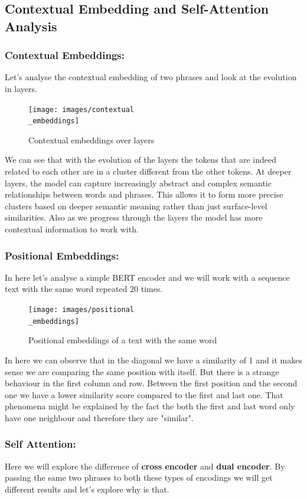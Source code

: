 \documentclass[runningheads]{llncs}
\begin{document}
\subsection{Contextual Embedding and Self-Attention Analysis}
\subsubsection{Contextual Embeddings:}
Let's analyse the contextual embedding of two phrases and look at the evolution in layers.

\begin{figure}[!htbp]
    \center
    \texttt{[image: images/contextual\\\_embeddings]}
    \caption{Contextual embeddings over layers}
\end{figure}
We can see that with the evolution of the layers the tokens that are indeed related to each other are in a cluster different from the other tokens. At deeper layers, the model can capture increasingly abstract and complex semantic relationships between words and phrases. This allows it to form more precise clusters based on deeper semantic meaning rather than just surface-level similarities. Also as we progress through the layers the model has more contextual information to work with.
\subsubsection{Positional Embeddings:}
In here let's analyse a simple BERT encoder and we will work with a sequence text with the same word repeated 20 times.\\[10pt]

\begin{figure}[!htbp]
    \center
    \texttt{[image: images/positional\\\_embeddings]}
    \caption{Positional embeddings of a text with the same word}
\end{figure}

In here we can observe that in the diagonal we have a similarity of 1 and it makes sense we are comparing the same position with itself. But there is a strange behaviour in the first column and row. Between the first position and the second one we have a lower similarity score compared to the first and last one. That phenomena might be explained by the fact the both the first and last word only have one neighbour and therefore they are "similar". 
\subsubsection{Self Attention:} 
Here we will explore the difference of \textbf{cross encoder} and \textbf{dual encoder}. By passing the same two phrases to both these types of encodings we will get different results and let's explore why is that.\\[5pt]
\end{document}

